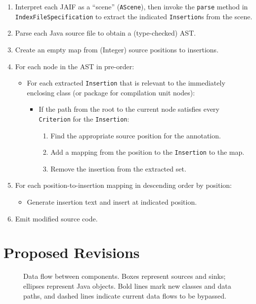 \documentclass{article}
\begin{document}
\begin{enumerate}
\item  Interpret each JAIF as a ``scene'' (\texttt{AScene}), then invoke
the \texttt{parse} method in \texttt{IndexFileSpecification} to extract
the indicated \texttt{Insertion}s from the scene.
\item  Parse each Java source file to obtain a (type-checked) AST.
\item  Create an empty map from (Integer) source positions to
insertions.
\item  For each node in the AST in pre-order:
\begin{itemize}
\item  For each extracted \texttt{Insertion} that is relevant to the
immediately enclosing class (or package for compilation unit nodes):
\begin{itemize}
\item  If the path from the root to the current node satisfies every
\texttt{Criterion} for the \texttt{Insertion}:
\begin{enumerate}
\item  Find the appropriate source position for the annotation.
\item  Add a mapping from the position to the \texttt{Insertion} to the
map.
\item  Remove the insertion from the extracted set.
\end{enumerate}
\end{itemize}
\end{itemize}
\item  For each position-to-insertion mapping in descending order by
position:
\begin{itemize}
\item  Generate insertion text and insert at indicated position.
\end{itemize}
\item  Emit modified source code.
\end{enumerate}

\section{Proposed Revisions}

\begin{figure}[ht]
\begin{center}
\end{center}
\caption{
Data flow between components.  Boxes represent sources and sinks;
ellipses represent Java objects.  Bold lines mark new classes and data
paths, and dashed lines indicate current data flows to be bypassed.
}
\label{fig:dataflow}
\end{figure}
\end{document}
